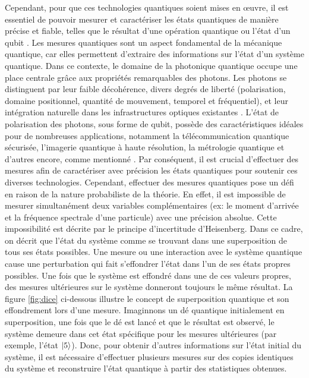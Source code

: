 \begin{onehalfspace}
    \noindent Cependant, pour que ces technologies quantiques 
    soient mises en œuvre, il est essentiel de pouvoir mesurer et
    caractériser les états quantiques de manière précise et fiable,
    telles que le résultat d'une opération quantique ou l'état d'un qubit
    \cite{DiVincenzo_2000,QTapplImpl}. Les mesures quantiques
    sont un aspect fondamental de la mécanique quantique, car elles
    permettent d'extraire des informations sur l'état d'un système
    quantique. Dans ce contexte, le domaine de la photonique quantique
    occupe une place centrale grâce aux propriétés remarquables des photons.
    Les photons se distinguent par leur faible décohérence, divers degrés
    de liberté (polarisation, domaine positionnel, quantité de mouvement,
    temporel et fréquentiel), et leur intégration naturelle dans les
    infrastructures optiques existantes \cite{browne2017quantumopticsquantumtechnologies,photonicInformation}. 
    L’état de polarisation des photons, sous forme de qubit, possède des 
    caractéristiques idéales pour de nombreuses applications, notamment 
    la télécommunication quantique sécurisée, l’imagerie quantique à 
    haute résolution, la métrologie quantique et d’autres encore, comme 
    mentionné \cite{QTintelecomindustry,metrology,QTapplImpl,Huang:22,SpinHallEffect,Wang_2019}.
    Par conséquent, il est crucial d’effectuer des mesures afin 
    de caractériser avec précision les états quantiques pour soutenir ces 
    diverses technologies. Cependant, effectuer des mesures quantiques 
    pose un défi en raison de la nature probabiliste de la théorie. 
    En effet, il est impossible de mesurer 
    simultanément deux variables complémentaires (ex: le moment d’arrivée 
    et la fréquence spectrale d'une particule) avec une précision absolue.
    Cette impossibilité est décrite par le 
    principe d’incertitude d’Heisenberg. Dans ce cadre, on décrit que 
    l’état du système comme se trouvant dans une superposition de tous 
    ses états possibles. Une mesure ou une interaction avec le système 
    quantique cause une perturbation qui fait s'effondrer l’état dans 
    l’un de ses états propres possibles. Une fois que le système est 
    effondré dans une de ces valeurs propres, des mesures ultérieures
    sur le système donneront toujours le même résultat. La figure 
    \ref{fig:dice} ci-dessous illustre le concept de superposition 
    quantique et son effondrement lors d'une mesure. Imaginnons 
    un dé quantique initialement en superposition, une fois que 
    le dé est lancé et que le résultat est observé, le système 
    demeure dans cet état spécifique pour les mesures ultérieures
    (par exemple, l’état $\ket{5}$). Donc, pour obtenir d'autres 
    informations sur l'état initial du système, il est nécessaire 
    d'effectuer plusieurs mesures sur des copies identiques du système
    et reconstruire l'état quantique à partir des statistiques
    obtenues.


\end{onehalfspace}
